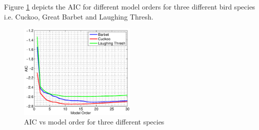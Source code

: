 \documentclass[a4paper]{article}
\begin{document}
 
 
Figure \ref{fig:AIC_3} depicts the AIC for different model orders for three different bird species i.e. Cuckoo, Great Barbet and Laughing Thresh. 

 \begin{figure}[!ht]
	\centering
	\includegraphics[width=0.5\textwidth,height=7 cm] {model_order_vs_AIC.eps}
	\caption{AIC vs model order for three different species }   
	\label{fig:AIC_3}
\end{figure} 


 
 
 
\end{document}

